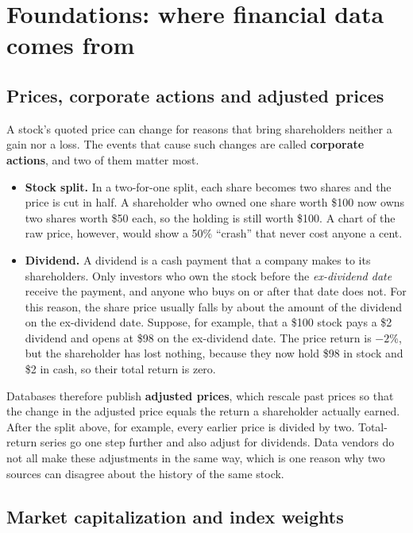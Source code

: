 \section{Foundations: where financial data comes from}
\label{sec:02-foundations}

\subsection{Prices, corporate actions and adjusted prices}

A stock's quoted price can change for reasons that bring shareholders neither a gain nor a loss. The events that cause such changes are called \textbf{corporate actions}, and two of them matter most.

\begin{itemize}
  \item \textbf{Stock split.} In a two-for-one split, each share becomes two shares and the price is cut in half. A shareholder who owned one share worth \$100 now owns two shares worth \$50 each, so the holding is still worth \$100. A chart of the raw price, however, would show a 50\% ``crash'' that never cost anyone a cent.
  \item \textbf{Dividend.} A dividend is a cash payment that a company makes to its shareholders. Only investors who own the stock before the \emph{ex-dividend date} receive the payment, and anyone who buys on or after that date does not. For this reason, the share price usually falls by about the amount of the dividend on the ex-dividend date. Suppose, for example, that a \$100 stock pays a \$2 dividend and opens at \$98 on the ex-dividend date. The price return is $-2$\%, but the shareholder has lost nothing, because they now hold \$98 in stock and \$2 in cash, so their total return is zero.
\end{itemize}

Databases therefore publish \textbf{adjusted prices}, which rescale past prices so that the change in the adjusted price equals the return a shareholder actually earned. After the split above, for example, every earlier price is divided by two. Total-return series go one step further and also adjust for dividends. Data vendors do not all make these adjustments in the same way, which is one reason why two sources can disagree about the history of the same stock.

\subsection{Market capitalization and index weights}

